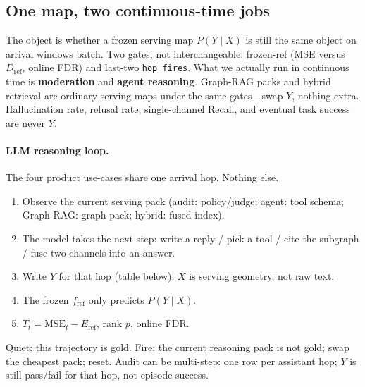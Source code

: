 \subsection{One map, two continuous-time jobs}
\label{sec:online-serving-gates}
The object is whether a frozen serving map \(P(Y\mid X)\) is still the same object
on arrival windows \(\mathrm{batch}\).
Two gates, not interchangeable: frozen-ref (MSE versus \(D_{\mathrm{ref}}\), online FDR)
and last-two \texttt{hop\_fires}.
What we actually run in continuous time is \textbf{moderation} and \textbf{agent reasoning}.
Graph-RAG packs and hybrid retrieval are ordinary serving maps under the same gates---swap \(Y\), nothing extra.
Hallucination rate, refusal rate, single-channel Recall, and eventual task success are never \(Y\).

\paragraph{LLM reasoning loop.}
The four product use-cases share one arrival hop. Nothing else.
\begin{enumerate}\itemsep=2pt
\item Observe the current serving pack
      (audit: policy/judge; agent: tool schema; Graph-RAG: graph pack; hybrid: fused index).
\item The model takes the next step: write a reply / pick a tool / cite the subgraph / fuse two channels into an answer.
\item Write \(Y\) for that hop (table below). \(X\) is serving geometry, not raw text.
\item The frozen \(f_{\mathrm{ref}}\) only predicts \(P(Y\mid X)\).
\item \(T_t=\mathrm{MSE}_t-E_{\mathrm{ref}}\), rank \(p\), online FDR.
\end{enumerate}
Quiet: this trajectory is gold.
Fire: the current reasoning pack is not gold; swap the cheapest pack; reset.
Audit can be multi-step: one row per assistant hop; \(Y\) is still pass/fail for that hop, not episode success.

